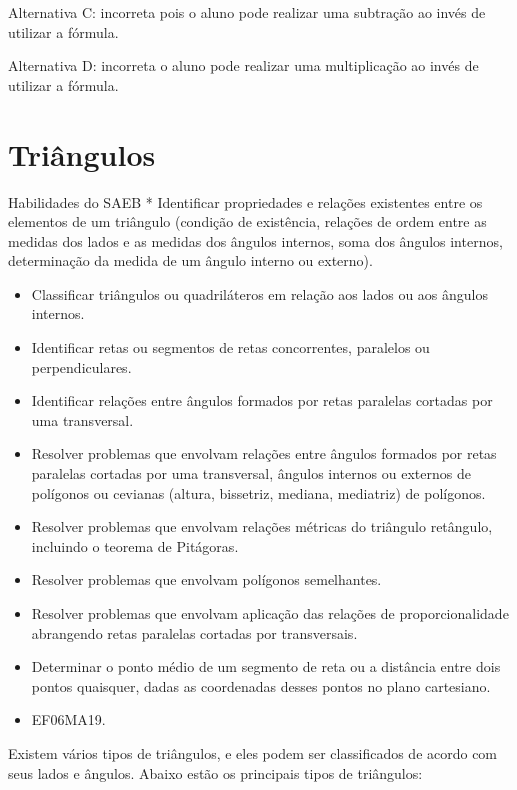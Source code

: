 Alternativa C: incorreta pois o aluno pode realizar uma subtração ao
invés de utilizar a fórmula.

Alternativa D: incorreta o aluno pode realizar uma multiplicação ao
invés de utilizar a fórmula.

\chapter{Triângulos}

Habilidades do SAEB * Identificar propriedades e relações existentes
entre os elementos de um triângulo (condição de existência, relações de
ordem entre as medidas dos lados e as medidas dos ângulos internos, soma
dos ângulos internos, determinação da medida de um ângulo interno ou
externo).

\begin{itemize}
\item
  Classificar triângulos ou quadriláteros em relação aos lados ou aos
  ângulos internos.
\item
  Identificar retas ou segmentos de retas concorrentes, paralelos ou
  perpendiculares.
\item
  Identificar relações entre ângulos formados por retas paralelas
  cortadas por uma transversal.
\item
  Resolver problemas que envolvam relações entre ângulos formados por
  retas paralelas cortadas por uma transversal, ângulos internos ou
  externos de polígonos ou cevianas (altura, bissetriz, mediana,
  mediatriz) de polígonos.
\item
  Resolver problemas que envolvam relações métricas do triângulo
  retângulo, incluindo o teorema de Pitágoras.
\item
  Resolver problemas que envolvam polígonos semelhantes.
\item
  Resolver problemas que envolvam aplicação das relações de
  proporcionalidade abrangendo retas paralelas cortadas por
  transversais.
\item
  Determinar o ponto médio de um segmento de reta ou a distância entre
  dois pontos quaisquer, dadas as coordenadas desses pontos no plano
  cartesiano.
\end{itemize}


\begin{itemize}
\item EF06MA19.
\end{itemize}

Existem vários tipos de triângulos, e eles podem ser classificados de
acordo com seus lados e ângulos. Abaixo estão os principais tipos de
triângulos:

